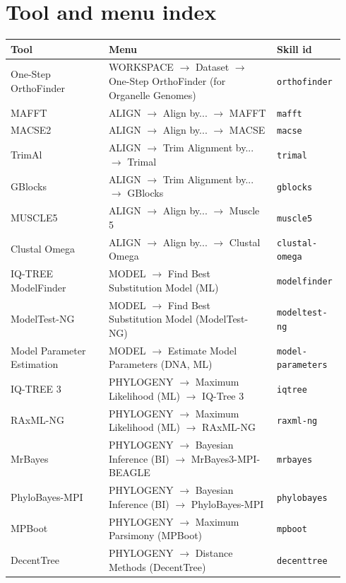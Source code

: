 \documentclass[11pt]{report}
\begin{document}
\appendix
\chapter{Tool and menu index}
\begin{longtable}{@{}p{0.28\linewidth}p{0.48\linewidth}p{0.18\linewidth}@{}}
\toprule
Tool & Menu & Skill id \\
\midrule
\endhead
One-Step OrthoFinder & WORKSPACE $\rightarrow$ Dataset $\rightarrow$ One-Step OrthoFinder (for Organelle Genomes) & \texttt{orthofinder} \\
MAFFT & ALIGN $\rightarrow$ Align by... $\rightarrow$ MAFFT & \texttt{mafft} \\
MACSE2 & ALIGN $\rightarrow$ Align by... $\rightarrow$ MACSE & \texttt{macse} \\
TrimAl & ALIGN $\rightarrow$ Trim Alignment by... $\rightarrow$ Trimal & \texttt{trimal} \\
GBlocks & ALIGN $\rightarrow$ Trim Alignment by... $\rightarrow$ GBlocks & \texttt{gblocks} \\
MUSCLE5 & ALIGN $\rightarrow$ Align by... $\rightarrow$ Muscle 5 & \texttt{muscle5} \\
Clustal Omega & ALIGN $\rightarrow$ Align by... $\rightarrow$ Clustal Omega & \texttt{clustal-omega} \\
IQ-TREE ModelFinder & MODEL $\rightarrow$ Find Best Substitution Model (ML) & \texttt{modelfinder} \\
ModelTest-NG & MODEL $\rightarrow$ Find Best Substitution Model (ModelTest-NG) & \texttt{modeltest-ng} \\
Model Parameter Estimation & MODEL $\rightarrow$ Estimate Model Parameters (DNA, ML) & \texttt{model-parameters} \\
IQ-TREE 3 & PHYLOGENY $\rightarrow$ Maximum Likelihood (ML) $\rightarrow$ IQ-Tree 3 & \texttt{iqtree} \\
RAxML-NG & PHYLOGENY $\rightarrow$ Maximum Likelihood (ML) $\rightarrow$ RAxML-NG & \texttt{raxml-ng} \\
MrBayes & PHYLOGENY $\rightarrow$ Bayesian Inference (BI) $\rightarrow$ MrBayes3-MPI-BEAGLE & \texttt{mrbayes} \\
PhyloBayes-MPI & PHYLOGENY $\rightarrow$ Bayesian Inference (BI) $\rightarrow$ PhyloBayes-MPI & \texttt{phylobayes} \\
MPBoot & PHYLOGENY $\rightarrow$ Maximum Parsimony (MPBoot) & \texttt{mpboot} \\
DecentTree & PHYLOGENY $\rightarrow$ Distance Methods (DecentTree) & \texttt{decenttree} \\

\end{longtable}
\end{document}
